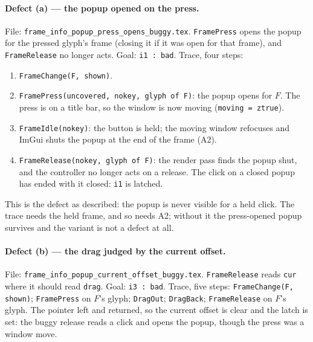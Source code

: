 \documentclass[a4paper,10pt,fleqn]{article}
\begin{document}
\paragraph{Defect (a) --- the popup opened on the press.}
File: \texttt{frame\_info\_popup\_press\_opens\_buggy.tex}.  \texttt{FramePress}
opens the popup for the pressed glyph's frame (closing it if it was open for
that frame), and \texttt{FrameRelease} no longer acts.  Goal: \texttt{i1 : bad}.
Trace, four steps:
\begin{enumerate}
  \item \texttt{FrameChange(F, shown)}.
  \item \texttt{FramePress(uncovered, nokey, glyph of F)}: the popup opens for
    $F$.  The press is on a title bar, so the window is now moving
    (\texttt{moving = ztrue}).
  \item \texttt{FrameIdle(nokey)}: the button is held; the moving window
    refocuses and ImGui shuts the popup at the end of the frame (A2).
  \item \texttt{FrameRelease(nokey, glyph of F)}: the render pass finds the
    popup shut, and the controller no longer acts on a release.  The click on a
    closed popup has ended with it closed: \texttt{i1} is latched.
\end{enumerate}
This is the defect as described: the popup is never visible for a held click.
The trace needs the held frame, and so needs A2; without it the press-opened
popup survives and the variant is not a defect at all.

\paragraph{Defect (b) --- the drag judged by the current offset.}
File: \texttt{frame\_info\_popup\_current\_offset\_buggy.tex}.
\texttt{FrameRelease} reads \texttt{cur} where it should read \texttt{drag}.
Goal: \texttt{i3 : bad}.  Trace, five steps: \texttt{FrameChange(F, shown)};
\texttt{FramePress} on $F$'s glyph; \texttt{DragOut}; \texttt{DragBack};
\texttt{FrameRelease} on $F$'s glyph.  The pointer left and returned, so the
current offset is clear and the latch is set: the buggy release reads a click
and opens the popup, though the press was a window move.
\end{document}
